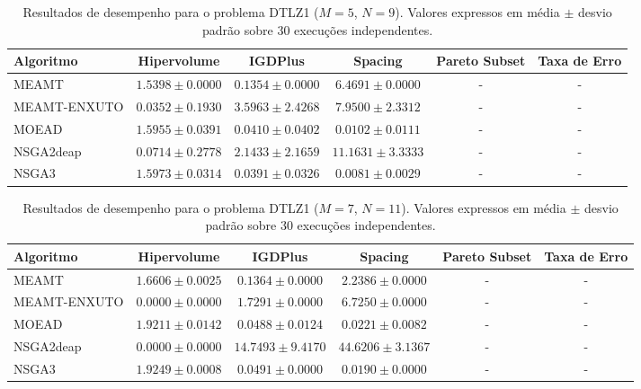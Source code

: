\begin{table}[htpb]
\centering
\caption{Resultados de desempenho para o problema DTLZ1 ($M=5$, $N=9$). Valores expressos em média $\pm$ desvio padrão sobre 30 execuções independentes.}
\label{tab:DTLZ1_M5_N9}
\begin{tabular}{lccccc}
\hline\hline
Algoritmo & Hipervolume & IGDPlus & Spacing & Pareto Subset & Taxa de Erro \\
\hline
MEAMT & $1.5398 \pm 0.0000$ & $0.1354 \pm 0.0000$ & $6.4691 \pm 0.0000$ & - & - \\
MEAMT-ENXUTO & $0.0352 \pm 0.1930$ & $3.5963 \pm 2.4268$ & $7.9500 \pm 2.3312$ & - & - \\
MOEAD & $1.5955 \pm 0.0391$ & $0.0410 \pm 0.0402$ & $0.0102 \pm 0.0111$ & - & - \\
NSGA2deap & $0.0714 \pm 0.2778$ & $2.1433 \pm 2.1659$ & $11.1631 \pm 3.3333$ & - & - \\
NSGA3 & $1.5973 \pm 0.0314$ & $0.0391 \pm 0.0326$ & $0.0081 \pm 0.0029$ & - & - \\
\hline\hline
\end{tabular}
\end{table}

\begin{table}[htpb]
\centering
\caption{Resultados de desempenho para o problema DTLZ1 ($M=7$, $N=11$). Valores expressos em média $\pm$ desvio padrão sobre 30 execuções independentes.}
\label{tab:DTLZ1_M7_N11}
\begin{tabular}{lccccc}
\hline\hline
Algoritmo & Hipervolume & IGDPlus & Spacing & Pareto Subset & Taxa de Erro \\
\hline
MEAMT & $1.6606 \pm 0.0025$ & $0.1364 \pm 0.0000$ & $2.2386 \pm 0.0000$ & - & - \\
MEAMT-ENXUTO & $0.0000 \pm 0.0000$ & $1.7291 \pm 0.0000$ & $6.7250 \pm 0.0000$ & - & - \\
MOEAD & $1.9211 \pm 0.0142$ & $0.0488 \pm 0.0124$ & $0.0221 \pm 0.0082$ & - & - \\
NSGA2deap & $0.0000 \pm 0.0000$ & $14.7493 \pm 9.4170$ & $44.6206 \pm 3.1367$ & - & - \\
NSGA3 & $1.9249 \pm 0.0008$ & $0.0491 \pm 0.0000$ & $0.0190 \pm 0.0000$ & - & - \\
\hline\hline
\end{tabular}
\end{table}

